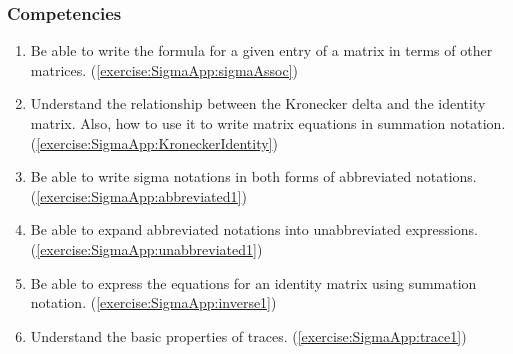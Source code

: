\subsubsection*{Competencies}
\begin{enumerate}
\item
Be able to write the formula for a given entry of a matrix in terms of other matrices. (\ref{exercise:SigmaApp:sigmaAssoc})
\item
Understand the relationship between the Kronecker delta and the identity matrix. Also, how to use it to write matrix equations in summation notation. (\ref{exercise:SigmaApp:KroneckerIdentity})
\item
Be able to write sigma notations in both forms of abbreviated notations. (\ref{exercise:SigmaApp:abbreviated1})
\item
Be able to expand abbreviated notations into unabbreviated expressions. (\ref{exercise:SigmaApp:unabbreviated1})
\item
Be able to express the equations for an identity matrix using summation notation. (\ref{exercise:SigmaApp:inverse1})
\item
Understand the basic properties of traces. (\ref{exercise:SigmaApp:trace1})
\end{enumerate}